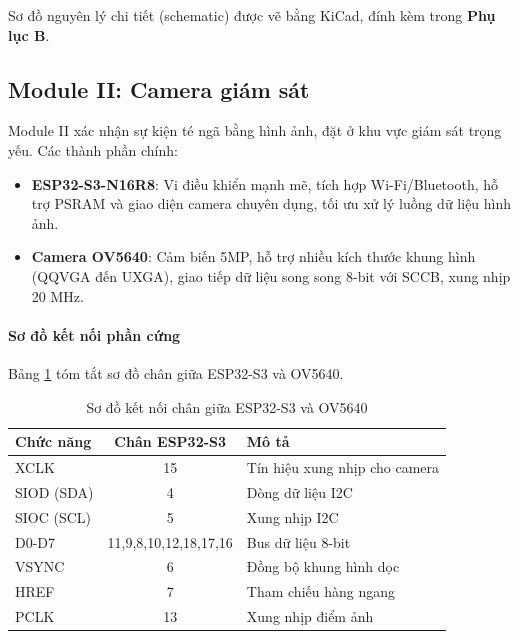Sơ đồ nguyên lý chi tiết (schematic) được vẽ bằng KiCad, đính kèm trong \textbf{Phụ lục B}.

\subsection{Module II: Camera giám sát}
\label{ssec:module_two}

Module II xác nhận sự kiện té ngã bằng hình ảnh, đặt ở khu vực giám sát trọng yếu. Các thành phần chính:

\begin{itemize}
    \item \textbf{ESP32-S3-N16R8}: Vi điều khiển mạnh mẽ, tích hợp Wi-Fi/Bluetooth, hỗ trợ PSRAM và giao diện camera chuyên dụng, tối ưu xử lý luồng dữ liệu hình ảnh.
    \item \textbf{Camera OV5640}: Cảm biến 5MP, hỗ trợ nhiều kích thước khung hình (QQVGA đến UXGA), giao tiếp dữ liệu song song 8-bit với SCCB, xung nhịp 20 MHz.
\end{itemize}

\paragraph{Sơ đồ kết nối phần cứng}
Bảng \ref{tab:pin_mapping} tóm tắt sơ đồ chân giữa ESP32-S3 và OV5640.

\begin{table}[H]
    \centering
    \caption{Sơ đồ kết nối chân giữa ESP32-S3 và OV5640}
    \label{tab:pin_mapping}
    \begin{tabular}{|l|c|l|}
    \hline
    \textbf{Chức năng} & \textbf{Chân ESP32-S3} & \textbf{Mô tả} \\
    \hline
    XCLK & 15 & Tín hiệu xung nhịp cho camera \\
    SIOD (SDA) & 4 & Dòng dữ liệu I2C \\
    SIOC (SCL) & 5 & Xung nhịp I2C \\
    D0-D7 & 11,9,8,10,12,18,17,16 & Bus dữ liệu 8-bit \\
    VSYNC & 6 & Đồng bộ khung hình dọc \\
    HREF & 7 & Tham chiếu hàng ngang \\
    PCLK & 13 & Xung nhịp điểm ảnh \\
    \hline
    \end{tabular}
\end{table}

